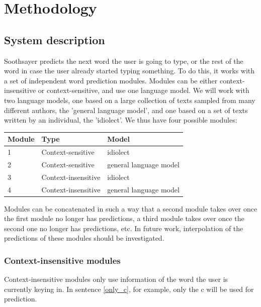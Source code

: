 \documentclass[12pt]{article}
\let\originaltable\table
\let\endoriginaltable\endtable
\renewenvironment{table}[1][ht]{%
  \originaltable[#1]
  \centering}%
  {\endoriginaltable}
\begin{document}
\section{Methodology}

\subsection{System description} \label{algorithm}

Soothsayer predicts the next word the user is going to type, or the rest of the word in case the user already started typing something. To do this, it works with a set of independent word prediction modules. Modules can be either context-insensitive or context-sensitive, and use one language model. We will work with two language models, one based on a large collection of texts sampled from many different authors, the 'general language model', and one based on a set of texts written by an individual, the 'idiolect'. We thus have four possible modules:

\begin{table}[htb]
\begin{tabular}{lll} 
Module&Type&Model\\
\hline
1& {\footnotesize Context-sensitive} & {\footnotesize idiolect}\\
2& {\footnotesize Context-sensitive} & {\footnotesize general language model} \\
3& {\footnotesize Context-insensitive} & {\footnotesize idiolect}\\ 
4& {\footnotesize Context-insensitive} & {\footnotesize general language model} \\
\end{tabular} 
\caption{Four possible modules: combinations of type and language model}
\end{table}

Modules can be concatenated in such a way that a second module takes over once the first module no longer has predictions, a third module takes over once the second one no longer has predictions, etc. In future work, interpolation of the predictions of these modules should be investigated.

\subsubsection{Context-insensitive modules} \label{ci}

Context-insensitive modules only use information of the word the user is currently keying in. In sentence \ref{only_c}, for example, only the c will be used for prediction. 
\end{document}
